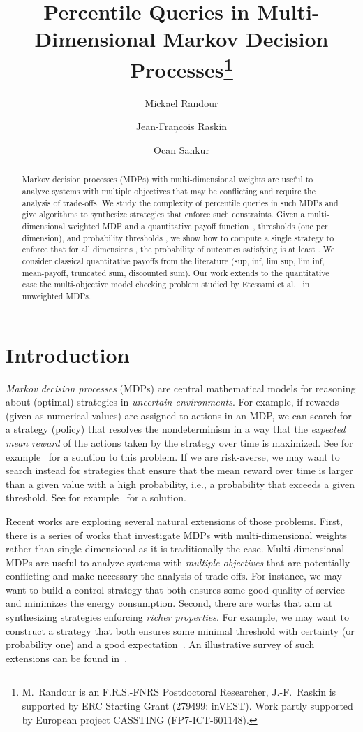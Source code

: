 \documentclass{llncs}
\title{Percentile Queries in Multi-Dimensional Markov Decision Processes\thanks{M.~Randour is an F.R.S.-FNRS Postdoctoral Researcher, J.-F.~Raskin is supported by ERC Starting Grant (279499: inVEST). Work partly supported by European project CASSTING (FP7-ICT-601148).}}
\author{Mickael Randour\inst{1} \and Jean-Fran\c{}cois Raskin\inst{1} \and Ocan Sankur\inst{2}}
\institute{
D\'epartement d'Informatique, Universit\'e libre de Bruxelles (ULB), Belgium
\and CNRS, Irisa, Rennes, France
}
\begin{document}
\maketitle

\begin{abstract}
Markov decision processes (MDPs) with multi-dimensional weights are useful to analyze systems with multiple objectives that may be conflicting and 
require the analysis of trade-offs. We study the complexity of percentile queries in such MDPs and give algorithms to synthesize strategies that enforce such constraints. 
Given a multi-dimensional weighted MDP and a quantitative payoff function~, thresholds  (one per dimension), and probability thresholds , 
we show how to compute a single strategy to enforce that for all dimensions , the probability of outcomes  satisfying  is at least . 
We consider classical quantitative payoffs from the literature (sup, inf, lim sup, lim inf, mean-payoff, truncated sum, discounted sum).  
Our work extends to the quantitative case  the multi-objective model checking problem studied by Etessami et al.~\cite{EKVY-lmcs08} in unweighted MDPs.
\end{abstract}

\section{Introduction}

{\em Markov decision processes} (MDPs) are central mathematical models for reasoning about (optimal) strategies in {\em uncertain environments}. For example, if rewards (given as numerical values) are assigned to actions in an MDP, we can search for a strategy (policy) that resolves the nondeterminism in a way that the {\em expected mean reward} of the actions taken by the strategy over time is maximized. See for example~\cite{Puterman-wiley94} for a solution to this problem. If we are risk-averse, we may want to search instead for strategies that ensure that the mean reward over time is larger than a given value with a high probability, i.e., a probability that exceeds a given threshold. See for example~\cite{FKR-ieee95} for a solution.

Recent works are exploring several natural extensions of those problems.
First, there is a series of works that investigate MDPs with multi-dimensional
weights~\cite{CMH-stacs06,BBCFK-lmcs14} rather than single-dimensional as it is
traditionally the case. Multi-dimensional MDPs are useful to analyze systems
with {\em multiple objectives} that are potentially conflicting and make
necessary the analysis of trade-offs. For instance, we may want to build a
control strategy that both ensures some good quality of service and minimizes the energy consumption. Second, there are works
that aim at synthesizing strategies enforcing {\em richer properties}. For
example, we may want to construct a strategy that both ensures some minimal
threshold with certainty (or probability one) and a good expectation~\cite{DBLP:conf/stacs/BruyereFRR14}. An illustrative survey of such extensions can be found in~\cite{DBLP:conf/vmcai/RandourRS15}.
 
\end{document}
